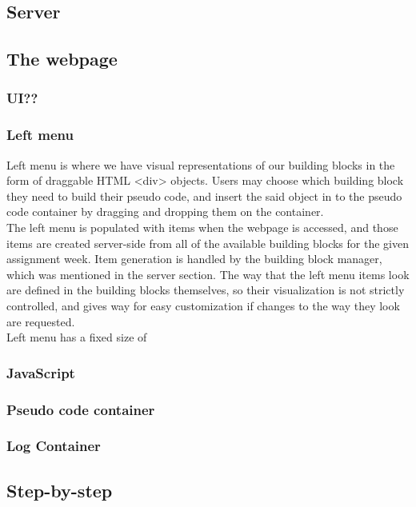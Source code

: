 \documentclass[11pt]{article}
\begin{document}
\subsection{Server}

\subsection{The webpage}

\subsubsection{UI??}

\subsubsection{Left menu}
Left menu is where we have visual representations of our building blocks in the form of draggable HTML <div> objects. Users may choose which building block they need to build their pseudo code, and insert the said object in to the pseudo code container by dragging and dropping them on the container.\\
The left menu is populated with items when the webpage is accessed, and those items are created server-side from all of the available building blocks for the given assignment week. Item generation is handled by the building block manager, which was mentioned in the server section. The way that the left menu items look are defined in the building blocks themselves, so their visualization is not strictly controlled, and gives way for easy customization if changes to the way they look are requested.\\
Left menu has a fixed size of  

\subsubsection{JavaScript}

\subsubsection{Pseudo code container}

\subsubsection{Log Container}

\subsection{Step-by-step}
\end{document}
